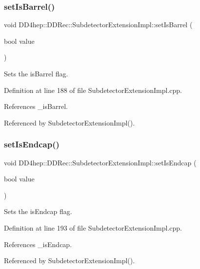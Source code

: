 \subsubsection{\texorpdfstring{set\+Is\+Barrel()}{setIsBarrel()}}
{\footnotesize\ttfamily void D\+D4hep\+::\+D\+D\+Rec\+::\+Subdetector\+Extension\+Impl\+::set\+Is\+Barrel (\begin{DoxyParamCaption}\item[{bool}]{value }\end{DoxyParamCaption})}



Sets the is\+Barrel flag. 



Definition at line 188 of file Subdetector\+Extension\+Impl.\+cpp.



References \+\_\+is\+Barrel.



Referenced by Subdetector\+Extension\+Impl().

\hypertarget{class_d_d4hep_1_1_d_d_rec_1_1_subdetector_extension_impl_acd89d4d2553a6ba4006ad39631fa864b}{}\label{class_d_d4hep_1_1_d_d_rec_1_1_subdetector_extension_impl_acd89d4d2553a6ba4006ad39631fa864b} 
\subsubsection{\texorpdfstring{set\+Is\+Endcap()}{setIsEndcap()}}
{\footnotesize\ttfamily void D\+D4hep\+::\+D\+D\+Rec\+::\+Subdetector\+Extension\+Impl\+::set\+Is\+Endcap (\begin{DoxyParamCaption}\item[{bool}]{value }\end{DoxyParamCaption})}



Sets the is\+Endcap flag. 



Definition at line 193 of file Subdetector\+Extension\+Impl.\+cpp.



References \+\_\+is\+Endcap.



Referenced by Subdetector\+Extension\+Impl().

